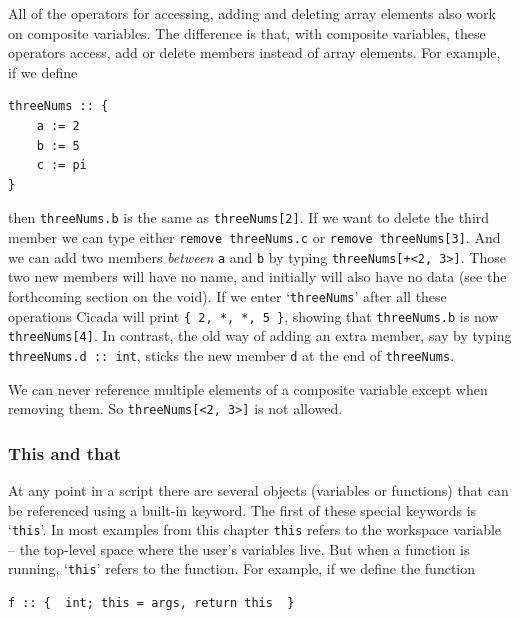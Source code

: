 \documentclass{article}
\newenvironment{code}{
       \begin{list}{}{
               \setlength{\leftmargin}{.4in}
               \setlength{\rightmargin}{0in}
               \setlength{\topsep}{.2in}
       }
       \small
       \item[] }
       { \end{list}   }
\begin{document}
All of the operators for accessing, adding and deleting array elements also work on composite variables.  The difference is that, with composite variables, these operators access, add or delete members instead of array elements.  For example, if we define

\begin{code} \begin{verbatim}
threeNums :: {
    a := 2
    b := 5
    c := pi
}
\end{verbatim} \end{code}

\noindent then \verb#threeNums.b# is the same as \verb#threeNums[2]#.  If we want to delete the third member we can type either \verb#remove threeNums.c# or \verb#remove threeNums[3]#.  And we can add two members \emph{between} \verb#a# and \verb#b# by typing \verb#threeNums[+<2, 3>]#.  Those two new members will have no name, and initially will also have no data (see the forthcoming section on the void).  If we enter `\verb#threeNums#' after all these operations Cicada will print \verb#{ 2, *, *, 5 }#, showing that \verb#threeNums.b# is now \verb#threeNums[4]#.  In contrast, the old way of adding an extra member, say by typing \verb#threeNums.d :: int#, sticks the new member \verb#d# at the end of \verb#threeNums#.

We can never reference multiple elements of a composite variable except when removing them.  So \verb#threeNums[<2, 3>]# is not allowed.



\subsubsection{This and that}

At any point in a script there are several objects (variables or functions) that can be referenced using a built-in keyword.  The first of these special keywords is `\verb#this#'.  In most examples from this chapter \verb#this# refers to the workspace variable -- the top-level space where the user's variables live.  But when a function is running, `\verb#this#' refers to the function.  For example, if we define the function

\begin{code} \begin{verbatim}
f :: {  int; this = args, return this  }
\end{verbatim} \end{code}
\end{document}
